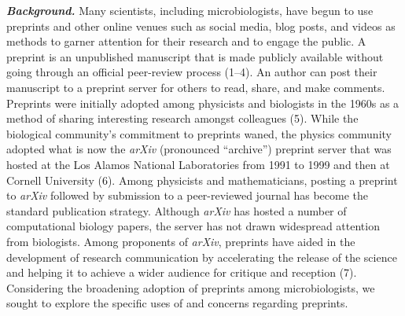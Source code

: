 \documentclass[11pt,]{article}
\begin{document}
\newpage

\textbf{\emph{Background.}} Many scientists, including microbiologists,
have begun to use preprints and other online venues such as social
media, blog posts, and videos as methods to garner attention for their
research and to engage the public. A preprint is an unpublished
manuscript that is made publicly available without going through an
official peer-review process (1--4). An author can post their manuscript
to a preprint server for others to read, share, and make comments.
Preprints were initially adopted among physicists and biologists in the
1960s as a method of sharing interesting research amongst colleagues
(5). While the biological community's commitment to preprints waned, the
physics community adopted what is now the \emph{arXiv} (pronounced
``archive'') preprint server that was hosted at the Los Alamos National
Laboratories from 1991 to 1999 and then at Cornell University (6). Among
physicists and mathematicians, posting a preprint to \emph{arXiv}
followed by submission to a peer-reviewed journal has become the
standard publication strategy. Although \emph{arXiv} has hosted a number
of computational biology papers, the server has not drawn widespread
attention from biologists. Among proponents of \emph{arXiv}, preprints
have aided in the development of research communication by accelerating
the release of the science and helping it to achieve a wider audience
for critique and reception (7). Considering the broadening adoption of
preprints among microbiologists, we sought to explore the specific uses
of and concerns regarding preprints.
\end{document}
